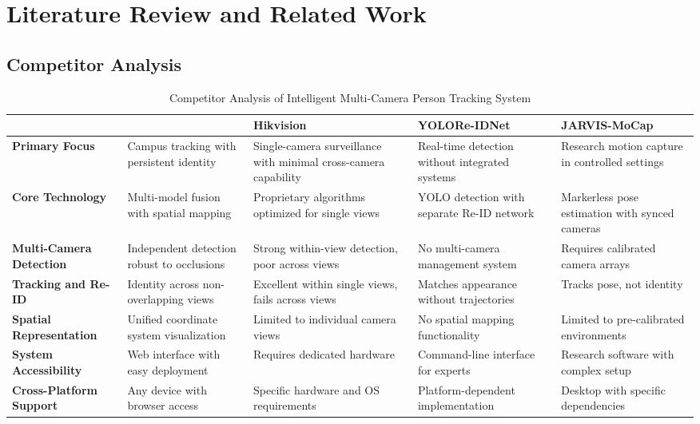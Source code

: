 \chapter{Literature Review and Related Work}
\label{chap:relatedworks}

\section{Competitor Analysis}
\label{section:competitor-analysis}

\begin{table}[htbp!]
   \begin{adjustwidth}{-.85in}{-.85in}
       \noindent
       \centering
       \small\begin{tabularx}{1.3\textwidth}{|X|>{\columncolor{green!20}}X|X|X|X|}
           \hline & \textbf{\usevar{\srsTitle}} & \textbf{Hikvision} & \textbf{YOLORe-IDNet} & \textbf{JARVIS-MoCap} \\\hline
           \textbf{Primary Focus} & Campus tracking with persistent identity & Single-camera surveillance with minimal cross-camera capability & Real-time detection without integrated systems & Research motion capture in controlled settings \\\hline
           \textbf{Core Technology} & Multi-model fusion with spatial mapping & Proprietary algorithms optimized for single views & YOLO detection with separate Re-ID network & Markerless pose estimation with synced cameras \\\hline
           \textbf{Multi-Camera Detection} & Independent detection robust to occlusions & Strong within-view detection, poor across views & No multi-camera management system & Requires calibrated camera arrays \\\hline
           \textbf{Tracking and Re-ID} & Identity across non-overlapping views & Excellent within single views, fails across views & Matches appearance without trajectories & Tracks pose, not identity \\\hline
           \textbf{Spatial Representation} & Unified coordinate system visualization & Limited to individual camera views & No spatial mapping functionality & Limited to pre-calibrated environments \\\hline
           \textbf{System Accessibility} & Web interface with easy deployment & Requires dedicated hardware & Command-line interface for experts & Research software with complex setup \\\hline
           \textbf{Cross-Platform Support} & Any device with browser access & Specific hardware and OS requirements & Platform-dependent implementation & Desktop with specific dependencies \\\hline
       \end{tabularx}
   \end{adjustwidth}
   \caption{Competitor Analysis of Intelligent Multi-Camera Person Tracking System}
\end{table}


